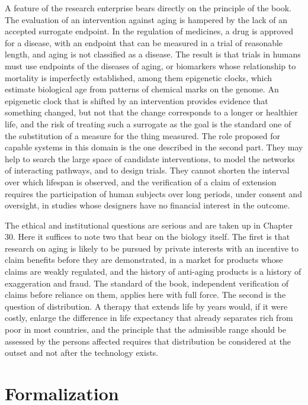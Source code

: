 A feature of the research enterprise bears directly on the principle of the book. The evaluation of an intervention against aging is hampered by the lack of an accepted surrogate endpoint. In the regulation of medicines, a drug is approved for a disease, with an endpoint that can be measured in a trial of reasonable length, and aging is not classified as a disease. The result is that trials in humans must use endpoints of the diseases of aging, or biomarkers whose relationship to mortality is imperfectly established, among them epigenetic clocks, which estimate biological age from patterns of chemical marks on the genome. An epigenetic clock that is shifted by an intervention provides evidence that something changed, but not that the change corresponds to a longer or healthier life, and the risk of treating such a surrogate as the goal is the standard one of the substitution of a measure for the thing measured. The role proposed for capable systems in this domain is the one described in the second part. They may help to search the large space of candidate interventions, to model the networks of interacting pathways, and to design trials. They cannot shorten the interval over which lifespan is observed, and the verification of a claim of extension requires the participation of human subjects over long periods, under consent and oversight, in studies whose designers have no financial interest in the outcome.

The ethical and institutional questions are serious and are taken up in Chapter 30. Here it suffices to note two that bear on the biology itself. The first is that research on aging is likely to be pursued by private interests with an incentive to claim benefits before they are demonstrated, in a market for products whose claims are weakly regulated, and the history of anti-aging products is a history of exaggeration and fraud. The standard of the book, independent verification of claims before reliance on them, applies here with full force. The second is the question of distribution. A therapy that extends life by years would, if it were costly, enlarge the difference in life expectancy that already separates rich from poor in most countries, and the principle that the admissible range should be assessed by the persons affected requires that distribution be considered at the outset and not after the technology exists.

\section*{Formalization}

